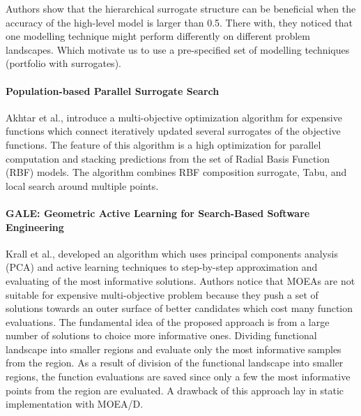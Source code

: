         Authors show that the hierarchical surrogate structure can be beneficial when the accuracy of the high-level model is larger than 0.5. There with, they noticed that one modelling technique might perform differently on different problem landscapes. Which motivate us to use a pre-specified set of modelling techniques (portfolio with surrogates).
        
        \paragraph{Population-based Parallel Surrogate Search} Akhtar et al.,\cite{akhtar2019efficient} introduce a multi-objective optimization algorithm for expensive functions which connect iteratively updated several surrogates of the objective functions. The feature of this algorithm is a high optimization for parallel computation and stacking predictions from the set of Radial Basis Function (RBF) models. The algorithm combines RBF composition surrogate, Tabu, and local search around multiple points. 


        \paragraph{GALE: Geometric Active Learning for Search-Based Software Engineering} Krall et al.,\cite{KrallMD15} developed an algorithm which uses principal components analysis (PCA) and active learning techniques to step-by-step approximation and evaluating of the most informative solutions. Authors notice that MOEAs are not suitable for expensive multi-objective problem because they push a set of solutions towards an outer surface of better candidates which cost many function evaluations. The fundamental idea of the proposed approach is from a large number of solutions to choice more informative ones. Dividing functional landscape into smaller regions and evaluate only the most informative samples from the region. As a result of division of the functional landscape into smaller regions, the function evaluations are saved since only a few the most informative points from the region are evaluated. A drawback of this approach lay in static implementation with MOEA/D.     


